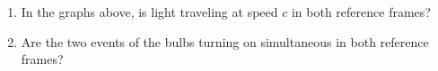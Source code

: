 \begin{enumerate}[labparts]
\item In the graphs above, is light traveling at speed $c$ in both reference frames?
\answerspace{0.6in}

\item Are the two events of the bulbs turning on simultaneous in both reference frames?


\end{enumerate}
